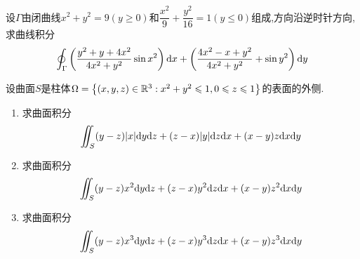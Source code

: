 \documentclass{ctexart}
\begin{document}
\begin{problem}[9.(10\songti{分})]
    设$\Gamma$由闭曲线$x^2+y^2=9(y\geqslant0)$和$\dfrac{x^2}{9}+\dfrac{y^2}{16}=1(y\leqslant0)$组成,方向沿逆时针方向,求曲线积分
    \[\oint_{\Gamma}\left(\dfrac{y^2+y+4x^2}{4x^2+y^2}\sin x^2\right)\mathrm{d} x+\left(\dfrac{4x^2-x+y^2}{4x^2+y^2}+\sin y^2\right)\mathrm{d} y\]

\end{problem}

\begin{problem}[10.(10\songti{分})]
    设曲面$S$是柱体$\Omega=\left\{(x,y,z)\in\mathbb{R}^3:x^2+y^2\leqslant1,0\leqslant z\leqslant1\right\}$的表面的外侧.
    \begin{enumerate}[label=\tbf{(\arabic*)}]
        \item 求曲面积分
            \[\iint_S(y-z)|x|\mathrm{d} y\mathrm{d} z+(z-x)|y|\mathrm{d} z\mathrm{d} x+(x-y)z\mathrm{d} x\mathrm{d} y\]
        \item 求曲面积分
            \[\iint_S(y-z)x^2\mathrm{d} y\mathrm{d} z+(z-x)y^2\mathrm{d} z\mathrm{d} x+(x-y)z^2\mathrm{d} x\mathrm{d} y\]
        \item 求曲面积分
            \[\iint_S(y-z)x^3\mathrm{d} y\mathrm{d} z+(z-x)y^3\mathrm{d} z\mathrm{d} x+(x-y)z^3\mathrm{d} x\mathrm{d} y\]
    \end{enumerate}
\end{problem}
\end{document}
